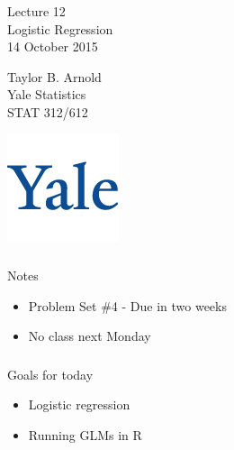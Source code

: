 



\begin{frame}[fragile] \frametitle{}

\vfill

{\fontsize{0.7cm}{0cm}\selectfont Lecture 12 \\\vspace{0.2cm}
Logistic Regression}\\\vspace{0.5cm}
14 October 2015

\vspace{2cm}

\begin{minipage}{0.6\textwidth}
Taylor B. Arnold \\
Yale Statistics \\
STAT 312/612
\end{minipage}
\hfill
\begin{minipage}{0.3\textwidth}\raggedleft
\includegraphics[scale=0.3]{../yale-logo.png}
\end{minipage}%

\end{frame}

\begin{frame}[fragile] \frametitle{}

{\color{yaleblue}\fontsize{16pt}{20pt}\selectfont Notes}

\begin{itemize}
\item Problem Set \#4 - Due in two weeks
\item No class next Monday
\end{itemize}

\end{frame}

\begin{frame}[fragile] \frametitle{}

{\color{yaleblue}\fontsize{16pt}{20pt}\selectfont Goals for today}

\begin{itemize}
\item Logistic regression
\item Running GLMs in R
\end{itemize}

\end{frame}


